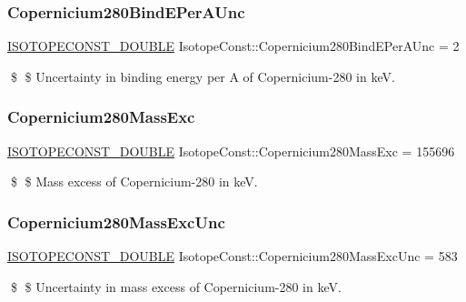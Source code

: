 \subsubsection{\texorpdfstring{Copernicium280\+Bind\+E\+Per\+A\+Unc}{Copernicium280BindEPerAUnc}}
{\footnotesize\ttfamily \mbox{\hyperlink{group___isotope_const-_macros_ga8f45a7272ce02c0b4c65c44636ed719a}{I\+S\+O\+T\+O\+P\+E\+C\+O\+N\+S\+T\+\_\+\+D\+O\+U\+B\+LE}} Isotope\+Const\+::\+Copernicium280\+Bind\+E\+Per\+A\+Unc = 2}

\$ \$ Uncertainty in binding energy per A of Copernicium-\/280 in keV. \mbox{\label{group___isotope_const-_copernicium-_cn280_ga86c5173e515b6a6b45249f00e4d77522}} 
\subsubsection{\texorpdfstring{Copernicium280\+Mass\+Exc}{Copernicium280MassExc}}
{\footnotesize\ttfamily \mbox{\hyperlink{group___isotope_const-_macros_ga8f45a7272ce02c0b4c65c44636ed719a}{I\+S\+O\+T\+O\+P\+E\+C\+O\+N\+S\+T\+\_\+\+D\+O\+U\+B\+LE}} Isotope\+Const\+::\+Copernicium280\+Mass\+Exc = 155696}

\$ \$ Mass excess of Copernicium-\/280 in keV. \mbox{\label{group___isotope_const-_copernicium-_cn280_ga897ebf85375ddcf4e713040fffffde82}} 
\subsubsection{\texorpdfstring{Copernicium280\+Mass\+Exc\+Unc}{Copernicium280MassExcUnc}}
{\footnotesize\ttfamily \mbox{\hyperlink{group___isotope_const-_macros_ga8f45a7272ce02c0b4c65c44636ed719a}{I\+S\+O\+T\+O\+P\+E\+C\+O\+N\+S\+T\+\_\+\+D\+O\+U\+B\+LE}} Isotope\+Const\+::\+Copernicium280\+Mass\+Exc\+Unc = 583}

\$ \$ Uncertainty in mass excess of Copernicium-\/280 in keV. \mbox{\label{group___isotope_const-_copernicium-_cn280_ga64cbb55b875f97cc6405ac5b90b477c0}} 
